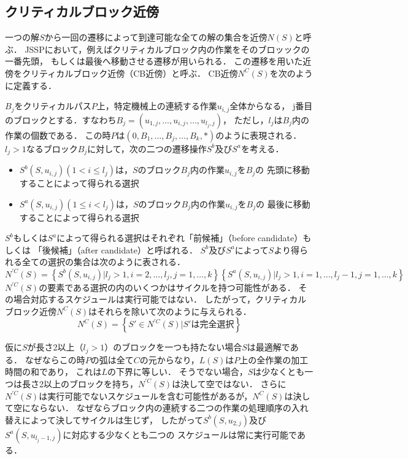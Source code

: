 \documentclass{jsarticle}
\begin{document}
\subsection{クリティカルブロック近傍}
一つの解$S$から一回の遷移によって到達可能な全ての解の集合を近傍$N(S)$と呼ぶ．
JSSPにおいて，例えばクリティカルブロック内の作業をそのブロッックの一番先頭，
もしくは最後へ移動させる遷移が用いられる．
この遷移を用いた近傍をクリティカルブロック近傍（CB近傍）と呼ぶ．
CB近傍$N^{C}(S)$を次のように定義する．

$B_j$をクリティカルパス$P$上，特定機械上の連続する作業$u_{i,j}$全体からなる，
j番目のブロックとする．すなわち$B_j=(u_{1,j},\dots,u_{i,j},\dots,u_{l_j,j})$，
ただし，$l_j$は$B_j$内の作業の個数である．
この時$P$は$(0,B_1,\dots,B_j,\dots,B_k,*)$のように表現される．
$l_j>1$なるブロック$B_j$に対して，次の二つの遷移操作$S^b$及び$S^a$を考える．
\begin{itemize}
	\item $S^b(S,u_{i,j})(1<i\leq l_j)$は，$S$のブロック$B_j$内の作業$u_{i,j}$を$B_j$の
		先頭に移動することによって得られる選択
	\item $S^a(S,u_{i,j})(1\leq i<l_j)$は，$S$のブロック$B_j$内の作業$u_{i,j}$を$B_j$の
		最後に移動することによって得られる選択
\end{itemize}
$S^b$もしくは$S^a$によって得られる選択はそれぞれ「前候補」（before candidate）もしくは
「後候補」（after candidate）と呼ばれる．
$S^b$及び$S^a$によって$S$より得られる全ての選択の集合は次のように表される．
\begin{equation}
	N^{'C}(S)=\left\{ S^b(S,u_{i,j})|l_j>1,i=2,\dots,l_j,j=1,\dots,k \right\}
	\left\{ S^a(S,u_{i,j})|l_j>1,i=1,\dots,l_j-1,j=1,\dots,k \right\}
\end{equation}
$N^{'C}(S)$の要素である選択の内のいくつかはサイクルを持つ可能性がある．
その場合対応するスケジュールは実行可能ではない．
したがって，クリティカルブロック近傍$N^C(S)$はそれらを除いて次のように与えられる．
\begin{equation}
	N^C(S)=\left\{S'\in N^{'C}(S)|S' は完全選択 \right\}
\end{equation}

仮に$S$が長さ2以上（$l_j>1$）のブロックを一つも持たない場合$S$は最適解である．
なぜならこの時$P$の弧は全て$C$の元からなり，$L(S)$は$P$上の全作業の加工時間の和であり，
これは$L$の下界に等しい．
そうでない場合，$S$は少なくとも一つは長さ2以上のブロックを持ち，$N^{'C}(S)$は決して空ではない．
さらに$N^{'C}(S)$は実行可能でないスケジュールを含む可能性があるが，$N^C(S)$は決して空にならない．
なぜならブロック内の連続する二つの作業の処理順序の入れ替えによって決してサイクルは生じず，
したがって$S^b(S,u_{2,j})$及び$S^a(S,u_{l_j-1,j})$に対応する少なくとも二つの
スケジュールは常に実行可能である．
\end{document}
